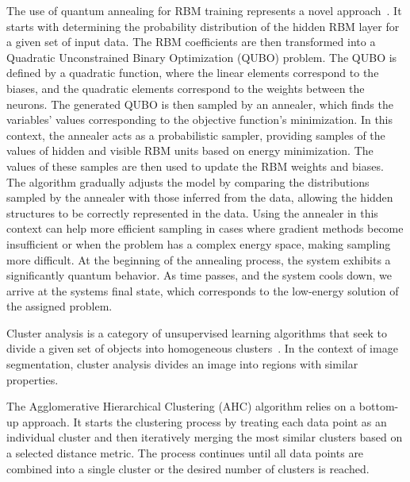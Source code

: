 \documentclass[runningheads]{llncs}
\begin{document}
The use of quantum annealing for RBM training represents a novel
approach~\cite{Datta2005, Dixit2021RBM_DWave}. It starts with determining the
probability distribution of the hidden RBM layer for a given set of input data.
The RBM coefficients are then transformed into a Quadratic Unconstrained Binary
Optimization (QUBO) problem. The QUBO is defined by a quadratic function, where
the linear elements correspond to the biases, and the quadratic elements
correspond to the weights between the neurons. The generated QUBO is then
sampled by an annealer, which finds the variables' values corresponding to the
objective function's minimization. In this context, the annealer acts as a
probabilistic sampler, providing samples of the values of hidden and visible RBM
units based on energy minimization. The values of these samples are then used to
update the RBM weights and biases. The algorithm gradually adjusts the model by
comparing the distributions sampled by the annealer with those inferred from the
data, allowing the hidden structures to be correctly represented in the data.
Using the annealer in this context can help more efficient sampling in cases
where gradient methods become insufficient or when the problem has a complex
energy space, making sampling more difficult. At the beginning of the annealing
process, the system exhibits a significantly quantum behavior. As time passes,
and the system cools down, we arrive at the systems final state, which
corresponds to the low-energy solution of the assigned problem. 

Cluster analysis is a category of unsupervised learning algorithms that seek to
divide a given set of objects into homogeneous clusters~\cite{Bratchell1989}. In
the context of image segmentation, cluster analysis divides an image into
regions with similar properties. 

The Agglomerative Hierarchical Clustering (AHC) algorithm relies on a bottom-up
approach. It starts the clustering process by treating each data point as an
individual cluster and then iteratively merging the most similar clusters based
on a selected distance metric. The process continues until all data points are
combined into a single cluster or the desired number of clusters is reached. 
\end{document}

